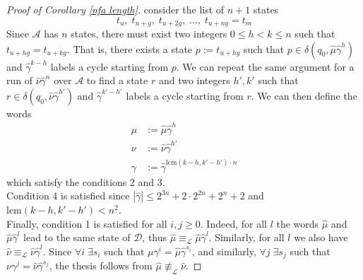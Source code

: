 \documentclass[runningheads]{llncs}
\begin{document}
\begin{proof}[Proof of Corollary \ref{nfa length}]
consider the list of $n+1$ states 
\[
t_u, \; t_{u+g}, \; t_{u+2g}, \; \dots, \; t_{u+ng} = t_m 
\]
Since $\mathcal A$ has $n$ states, there must exist two integers $0 \le h < k \le n$ such that $t_{u+hg} = t_{u+kg}$. That is, there exists a state $p := t_{u+hg}$ such that $p \in \delta\left(q_0, \hat\mu\hat\gamma^h\right)$ and $\hat\gamma^{k-h}$ labels a cycle starting from $p$. We can repeat the same argument for a run of $\hat\nu\hat\gamma^n$ over $\mathcal A$ to find a state $r$ and two integers $h', k'$ such that $r \in \delta(q_0, \hat\nu\hat\gamma^{h'})$ and $\hat\gamma^{k'-h'}$ labels a cycle starting from $r$. We can then define the words
\begin{align*}
\mu &:= \hat\mu \hat\gamma^{h} \\
\nu &:= \hat\nu \hat\gamma^{h'} \\
\gamma &:= \hat\gamma^{\text{lcm}(k-h, k'-h')\cdot n}
\end{align*}
which satisfy the conditions 2 and 3.
\\Condition 4 is satisfied since $|\hat\gamma| \le 2^{3n}+2\cdot2^{2n}+2^n+2$ and $\text{lcm}(k-h,k'-h') < n^2$.
\\Finally, condition 1 is satisfied for all $i,j\ge0$. Indeed, for all $l$ the words $\hat\mu$ and $\hat\mu\hat\gamma^l$ lead to the same state of $\mathcal D$, thus $\hat\mu \equiv_\mathcal L \hat\mu\hat\gamma^l$. Similarly, for all $l$ we also have $\hat\nu \equiv_\mathcal L \hat\nu\hat\gamma^l$. Since $\forall i\; \exists s_i$ such that $\mu\gamma^i = \hat\mu \hat\gamma^{s_i}$, and similarly, $\forall j\; \exists s_j$ such that $\nu \gamma^j= \hat\nu \hat\gamma^{s_j}$, the thesis follows from $\hat\mu \not\equiv_\mathcal L \hat\nu$. 
\end{proof}

\vskip5mm
\end{document}
